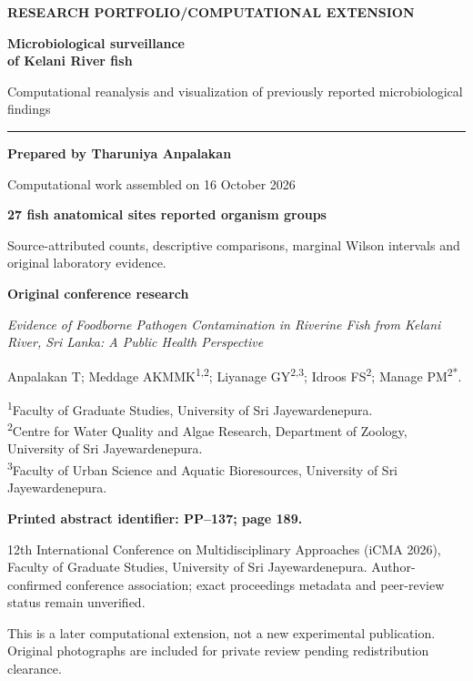 \documentclass[11pt,a4paper]{article}
\begin{document}
\begin{titlepage}
\thispagestyle{empty}
{\sffamily\color{accent}\bfseries RESEARCH PORTFOLIO\quad /\quad COMPUTATIONAL EXTENSION}\par
\vspace{15mm}
{\sffamily\bfseries\color{ink}\Huge Microbiological surveillance\\[3mm]of Kelani River fish}\par
\vspace{8mm}
{\Large Computational reanalysis and visualization of previously reported microbiological findings}\par
\vspace{8mm}
{\color{accent}\rule{\textwidth}{1.2pt}}\par
\vspace{5mm}
\textbf{Prepared by Tharuniya Anpalakan}\par
Computational work assembled on 16 October 2026\par
\vspace{5mm}
\colorbox{pale}{\parbox{\dimexpr\textwidth-2\fboxsep\relax}{\vspace{3mm}
\textbf{27 fish\quad\textbar{} anatomical sites\quad\textbar{} reported organism groups}\par
Source-attributed counts, descriptive comparisons, marginal Wilson intervals and original laboratory evidence.\vspace{3mm}}}
\vfill
\textbf{Original conference research}\par
\emph{Evidence of Foodborne Pathogen Contamination in Riverine Fish from Kelani River, Sri Lanka: A Public Health Perspective}\par
Anpalakan T; Meddage AKMMK\textsuperscript{1,2}; Liyanage GY\textsuperscript{2,3};
Idroos FS\textsuperscript{2}; Manage PM\textsuperscript{2*}.\par
{\small
\textsuperscript{1}Faculty of Graduate Studies, University of Sri Jayewardenepura.\\
\textsuperscript{2}Centre for Water Quality and Algae Research, Department of Zoology, University of Sri Jayewardenepura.\\
\textsuperscript{3}Faculty of Urban Science and Aquatic Bioresources, University of Sri Jayewardenepura.}
\par\vspace{4mm}
\textbf{Printed abstract identifier: PP--137; page 189.}\par
{\small 12th International Conference on Multidisciplinary Approaches (iCMA 2026), Faculty of Graduate Studies, University of Sri Jayewardenepura. Author-confirmed conference association; exact proceedings metadata and peer-review status remain unverified.}\par
\vspace{5mm}
{\small\color{muted} This is a later computational extension, not a new experimental publication. Original photographs are included for private review pending redistribution clearance.}
\end{titlepage}
\end{document}
